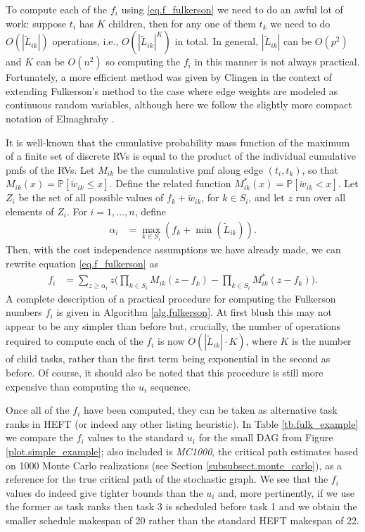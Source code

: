 \documentclass[12pt]{article}
\def\P{\mathbb{P}}
\begin{document}
To compute each of the $f_i$ using \eqref{eq.f_fulkerson} we need to do an awful lot of work: suppose $t_i$ has $K$ children, then for any one of them $t_k$ we need to do $O(|\tilde{L}_{ik}|)$ operations, i.e., $O(|\tilde{L}_{ik}|^K)$ in total. In general, $|\tilde{L}_{ik}|$ can be $O(p^2)$ and $K$ can be $O(n^2)$ so computing the $f_i$ in this manner is not always practical. Fortunately, a more efficient method was given by Clingen \cite{cling64} in the context of extending Fulkerson's method to the case where edge weights are modeled as continuous random variables, although here we follow the slightly more compact notation of Elmaghraby \cite{elmaghraby67}. 

It is well-known that the cumulative probability mass function of the maximum of a finite set of discrete RVs is equal to the product of the individual cumulative pmfs of the RVs. Let $M_{ik}$ be the cumulative pmf along edge $(t_i, t_k)$, so that $M_{ik}(x) = \P[\tilde{w}_{ik} \leq x]$. Define the related function $M_{ik}^{*}(x) = \P[\tilde{w}_{ik} < x]$. Let $Z_i$ be the set of all possible values of $f_k + \tilde{w}_{ik}$, for $k \in S_i$, and let $z$ run over all elements of $Z_i$. For $i = 1, \dots, n$, define 
\begin{align}
\alpha_i &= \max_{k \in S_i}(f_k + \min(\tilde{L}_{ik})).
\end{align}
Then, with the cost independence assumptions we have already made, we can rewrite equation \eqref{eq.f_fulkerson} as 
\begin{align}
f_i &= \sum_{z \geq \alpha_i} z \bigg( \prod_{k \in S_i} M_{ik}(z - f_k) - \prod_{k \in S_i} M_{ik}^{*}(z - f_k) \bigg). \label{eq.f_clingen}
\end{align}
A complete description of a practical procedure for computing the Fulkerson numbers $f_i$ is given in Algorithm \ref{alg.fulkerson}. At first blush this may not appear to be any simpler than before but, crucially, the number of  operations required to compute each of the $f_i$ is now $O(|\tilde{L}_{ik}| \cdot K)$, where $K$ is the number of child tasks, rather than the first term being exponential in the second as before. Of course, it should also be noted that this procedure is still more expensive than computing the $u_i$ sequence. 

Once all of the $f_i$ have been computed, they can be taken as alternative task ranks in HEFT (or indeed any other listing heuristic). In Table \ref{tb.fulk_example} we compare the $f_i$ values to the standard $u_i$ for the small DAG from Figure \ref{plot.simple_example}; also included is {\em MC1000}, the critical path estimates based on 1000 Monte Carlo realizations (see Section \ref{subsubsect.monte_carlo}), as a reference for the true critical path of the stochastic graph. We see that the $f_i$ values do indeed give tighter bounds than the $u_i$ and, more pertinently, if we use the former as task ranks then task 3 is scheduled before task 1 and we obtain the smaller schedule makespan of 20 rather than the standard HEFT makespan of 22. 
\end{document}
